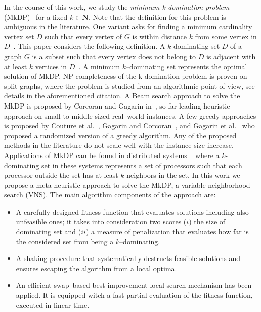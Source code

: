 \documentclass[dvipsnames,format=sigconf,anonymous=true,review=true]{acmart}
\begin{document}
In the course of this work, we study the \emph{minimum k-domination problem} (MkDP)~\cite{corcoran2021heuristics} for a fixed $k \in \mathbf{N}$.  Note that the definition for this problem is ambiguous in the literature. One variant asks for finding a minimum cardinality vertex set $ D$ such that every vertex of $G$ is within distance $k$ from some vertex in $D$~\cite{chang1983k}. 
This paper considers the following definition.  A $k$-dominating set  $D$ of a graph $G$ is a subset such that every vertex does not belong to $D$ is adjacent with at least $k$ vertices in  $D$~\cite{lan2013algorithmic}. A minimum $k$--dominating set represents the optimal solution of MkDP.  NP-completeness of the k-domination problem is proven on split graphs, where the problem is studied from an algorithmic point of view, see details in the aforementioned citation. A Beam search approach to solve the MkDP is proposed by Corcoran and Gagarin   in~\cite{corcoran2021heuristics}, so-far leading heuristic approach on small-to-middle sized real--world instances. A few greedy approaches is proposed by Couture et al.~\cite{couture2006incremental}, Gagarin and Corcoran~\cite{gagarin2018multiple}, and  Gagarin et al.~\cite{gagarin2013randomized} who proposed a randomized version of a greedy algorithm. Any of the proposed methods in the literature do not scale well with the instance size increase.   
Applications of MkDP can be found in  distributed systems  ~\cite{wang2013minimising} where  a $k$-dominating set in these systems represents a set of processors such that each processor outside the set has at least $k$ neighbors in the set.
In this work we propose a meta-heuristic approach to solve the MkDP, a variable neighborhood search (VNS). The main algorithm components of the approach are:
\begin{itemize}
	\item A carefully designed fitness function that evaluates solutions  including also unfeasible ones; it takes into consideration two scores ($i$) the size of dominating set and ($ii$) a measure of penalization that evaluates how far is the considered set from being a $k$--dominating. 
	\item A shaking procedure that systematically destructs feasible solutions and ensures escaping the algorithm from a local optima.
	\item An efficient swap--based  best-improvement local search mechanism   has been applied. It is equipped witch a fast partial evaluation of the fitness function, executed in linear time.
 
\end{itemize}
\end{document}
